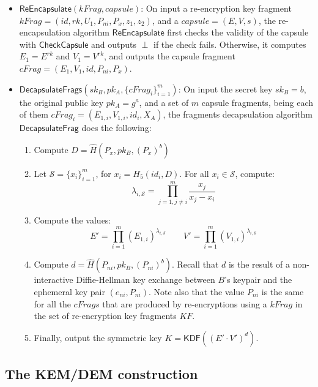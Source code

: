 \documentclass{amsart}
\renewcommand{\P}[1]{P_{#1}}
\begin{document}
\begin{itemize}
\item $\mathsf{ReEncapsulate}(kFrag, capsule)$: On input a re-encryption key fragment $kFrag= (id, rk, U_1, \P{ni}, \P x, z_1, z_2)$, and a $capsule = (E,V,s)$, the re-encapsulation algorithm $\mathsf{ReEncapsulate}$ first checks the validity of the capsule with $\mathsf{CheckCapsule}$ and outputs $\perp$ if the check fails. Otherwise, it computes $E_1 = E^{rk}$ and $V_1 = V^{rk}$, and outputs the capsule fragment $cFrag = (E_1, V_1, id, \P{ni}, \P x)$. 

\item $\mathsf{DecapsulateFrags}(sk_B, pk_A, \{cFrag_i\}_{i=1}^m)$: On input the secret key $sk_B = b$, the original public key $pk_A = g^a$, and a set of $m$ capsule fragments, being each of them $cFrag_i = (E_{1,i}, V_{1,i}, id_i, X_A)$, the fragments decapsulation algorithm $\mathsf{DecapsulateFrag}$ does the following:
	
	\begin{enumerate}
	\item Compute $ D = \hat H(\P x, pk_B, (\P x)^{b})$
    \item Let $\mathcal S = \{x_i\}_{i=1}^m$, for $x_i = H_5(id_i, D)$. For all $x_i\in \mathcal S$, compute:
    \[\lambda_{i, \mathcal S} = \prod\limits_{j=1, j\neq i}^m \frac{x_j}{x_j-x_i}\]
    \item Compute the values:
     	$$E' = \prod\limits_{i=1}^{m} (E_{1,i})^{\lambda_{i, \mathcal S}}	
		\qquad
		V' = \prod\limits_{i=1}^{m} (V_{1,i})^{\lambda_{i, \mathcal S}}$$
	\item Compute $d = \hat H(\P{ni}, pk_B, (\P{ni})^b)$. Recall that $d$ is the result of a non-interactive Diffie-Hellman key exchange between $B$'s keypair and the ephemeral key pair $(e_{ni}, \P{ni})$. Note also that the value $\P{ni}$ is the same for all the $cFrags$ that are produced by re-encryptions using a $kFrag$ in the set of re-encryption key fragments $KF$. 
	\item Finally, output the symmetric key $K= \mathsf{KDF}((E'\cdot V')^{d})$. 
	\end{enumerate}




\end{itemize}

		

\subsection{The KEM/DEM construction}
\end{document}
